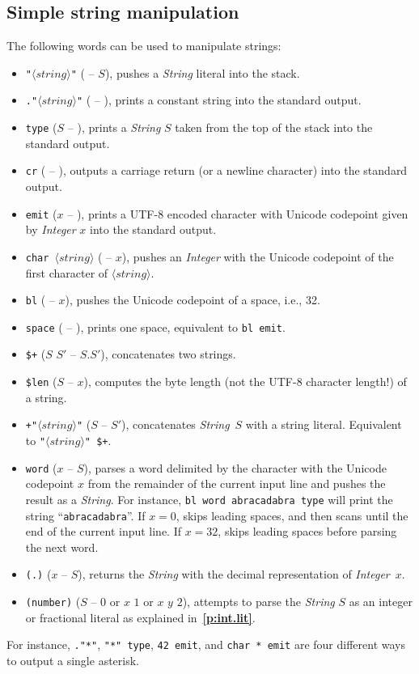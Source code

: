\documentclass[12pt,oneside]{article}
\def\refpoint#1{{\rm\textbf{\ref{#1}}}}
\let\ptref=\refpoint
\def\mysubsection#1{\subsection{#1}\fancyhead[C]{\small{\textsc{\textrm{\thesubsection.} #1}}}}
\begin{document}
\mysubsection{Simple string manipulation}\label{p:string.ops}
The following words can be used to manipulate strings:
\begin{itemize}
\item {\tt"$\langle\textit{string}\rangle$"} ( -- $S$), pushes a {\em String\/} literal into the stack.
\item {\tt."$\langle\textit{string}\rangle$"} ( -- ), prints a constant string into the standard output.
\item {\tt type} ($S$ -- ), prints a {\em String\/} $S$ taken from the top of the stack into the standard output.
\item {\tt cr} ( -- ), outputs a carriage return (or a newline character) into the standard output.
\item {\tt emit} ($x$ -- ), prints a UTF-8 encoded character with Unicode codepoint given by {\em Integer\/} $x$ into the standard output.
\item {\tt char $\langle\textit{string}\rangle$} ( -- $x$), pushes an {\em Integer\/} with the Unicode codepoint of the first character of {\tt $\langle\textit{string}\rangle$}.
\item {\tt bl} ( -- $x$), pushes the Unicode codepoint of a space, i.e., 32.
\item {\tt space} ( -- ), prints one space, equivalent to {\tt bl emit}.
\item {\tt \$+} ($S$ $S'$ -- $S.S'$), concatenates two strings.
\item {\tt \$len} ($S$ -- $x$), computes the byte length (not the UTF-8 character length!) of a string.
\item {\tt +"$\langle\textit{string}\rangle$"} ($S$ -- $S'$), concatenates {\em String\/}~$S$ with a string literal. Equivalent to {\tt "$\langle\textit{string}\rangle$" \$+}.
\item {\tt word} ($x$ -- $S$), parses a word delimited by the character with the Unicode codepoint $x$ from the remainder of the current input line and pushes the result as a {\em String}. For instance, {\tt bl word abracadabra type} will print the string ``{\tt abracadabra}''. If $x=0$, skips leading spaces, and then scans until the end of the current input line. If $x=32$, skips leading spaces before parsing the next word.
\item {\tt (.)} ($x$ -- $S$), returns the {\em String\/} with the decimal representation of {\em Integer\/}~$x$.
\item {\tt (number)} ($S$ -- $0$ or $x$ $1$ or $x$ $y$ $2$), attempts to parse the {\em String\/} $S$ as an integer or fractional literal as explained in~\ptref{p:int.lit}.
\end{itemize}
For instance, {\tt ."*"}, {\tt "*" type}, {\tt 42 emit}, and {\tt char * emit} are four different ways to output a single asterisk.
\end{document}
